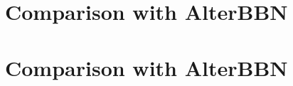 \chapter{Comparison with AlterBBN}
\label{chap:Alter}


\chapter{Comparison with AlterBBN}
\label{sec:Altercompare}


